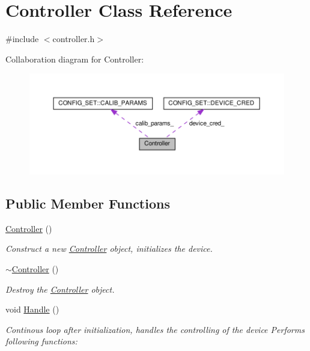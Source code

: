 \hypertarget{classController}{}\section{Controller Class Reference}
\label{classController}


{\ttfamily \#include $<$controller.\+h$>$}



Collaboration diagram for Controller\+:
\nopagebreak
\begin{figure}[H]
\begin{center}
\leavevmode
\includegraphics[width=350pt]{classController__coll__graph}
\end{center}
\end{figure}
\subsection*{Public Member Functions}
\begin{DoxyCompactItemize}
\item 
\hyperlink{classController_a95c56822d667e94b031451729ce069a9}{Controller} ()
\begin{DoxyCompactList}\small\item\em Construct a new \hyperlink{classController}{Controller} object, initializes the device. \end{DoxyCompactList}\item 
\hyperlink{classController_a0ab87934c4f7a266cfdb86e0f36bc1b5}{$\sim$\+Controller} ()
\begin{DoxyCompactList}\small\item\em Destroy the \hyperlink{classController}{Controller} object. \end{DoxyCompactList}\item 
void \hyperlink{classController_a4705ffb61d722e4916ba0d279dc27395}{Handle} ()
\begin{DoxyCompactList}\small\item\em Continous loop after initialization, handles the controlling of the device Performs following functions\+: \end{DoxyCompactList}\end{DoxyCompactItemize}
